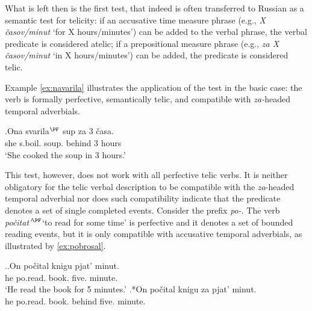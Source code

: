 What is left then is the first test, that indeed is often transferred to Russian as a semantic test for telicity: if an accusative time measure phrase (e.g., \textit{X \v{c}asov/minut} `for X hours/minutes') can be added to the verbal phrase, the verbal predicate is considered atelic; if a prepositional measure phrase (e.g., \textit{za X \v{c}asov/minut} `in X hours/minutes') can be added, the predicate is considered telic.

Example \ref{ex:navarila} illustrates the application of the test in the basic case: the verb is formally perfective, semantically telic, and compatible with \textit{za-}headed temporal adverbials. 

\exg.\label{ex:navarila}Ona svarila$^{\PF}$ sup za 3 \v{c}asa.\\
she s.boil. soup. behind 3 hours\\
\vspace{0.5em}
`She cooked the soup in 3 hours.'

This test, however, does not work with all perfective telic verbs. It is neither obligatory for the telic verbal description to be compatible with the \textit{za}-headed temporal adverbial nor does such compatibility indicate that the predicate denotes a set of single completed events. Consider the prefix \textit{po-}. The verb \textit{po\v{c}itat'$^{\PF}$}`to read for some time' is perfective and it denotes a set of bounded reading events, but it is only compatible with accusative temporal adverbials, as illustrated by \ref{ex:pobrosal}.

\ex.\label{ex:pobrosal}\ag.\label{ex:pobrosal:delim}On po\v{c}ital knigu pjat' minut.\\
he po.read. book. five. minute.\\
\vspace{0.5em}
`He read the book for 5 minutes.'
\bg.*On po\v{c}ital knigu za pjat' minut.\\
he po.read. book. behind five. minute.\\


